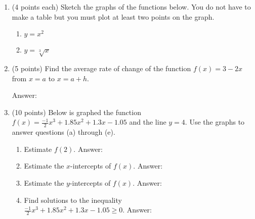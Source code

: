 \documentclass[12pt]{article}
\begin{document}
\begin{enumerate}
\item (4 points each) Sketch the graphs of the functions below. You do not have to make a table but you must plot at least two points on the graph.
\begin{enumerate}
\item $y=x^2$
\begin{center}
\end{center}
\vfill
\item $y=\sqrt[3]{x}$
\begin{center}
\end{center}
\end{enumerate}
\newpage
\item (5 points) Find the average rate of change of the function $f(x)=3-2x$ from $x=a$ to $x=a+h.$
\begin{flushright}{ Answer:\underline{\hspace{2in}}}\end{flushright}
\vfill
\item (10 points) Below is graphed the function $f(x)=\frac{-1}{2}x^3+1.85x^2+1.3x-1.05 $ and the line $y=4.$ Use the graphs to answer questions (a) through (e).

\begin{enumerate}
\item Estimate $f(2).$ \hfill { Answer:\underline{\hspace{2in}}}
\vspace{.2in}
\item Estimate the $x$-intercepts of $f(x)$.\hfill{ Answer:\underline{\hspace{2in}}}
\vspace{.2in}
\item Estimate the $y$-intercepts of $f(x)$.\hfill{ Answer:\underline{\hspace{2in}}}
\item Find solutions to the inequality \\
$\frac{-1}{2}x^3+1.85x^2+1.3x-1.05\geq 0.$
\hfill Answer:\underline{\hspace{2in}}


\end{enumerate}
\end{enumerate}
\end{document}
